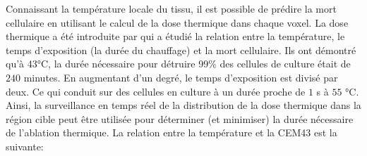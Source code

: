 
Connaissant la température locale du tissu, il est possible de prédire la mort cellulaire en utilisant le calcul de la dose thermique dans chaque voxel. La dose thermique a été introduite par \cite{sapareto1984thermal} qui a étudié la relation entre la température, le temps d'exposition (la durée du chauffage) et la mort cellulaire. Ils ont démontré qu'à 43°C, la durée nécessaire pour détruire 99\% des cellules de culture était de $240$ minutes. En augmentant d'un degré, le temps d'exposition est divisé par deux. Ce qui conduit sur des cellules en culture à un durée proche de $1$ s à $55$ °C. Ainsi, la surveillance en temps réel de la distribution de la dose thermique dans la région cible peut être utilisée pour déterminer (et minimiser) la durée nécessaire de l'ablation thermique. La relation entre la température et la \ac{CEM43} est la suivante:

